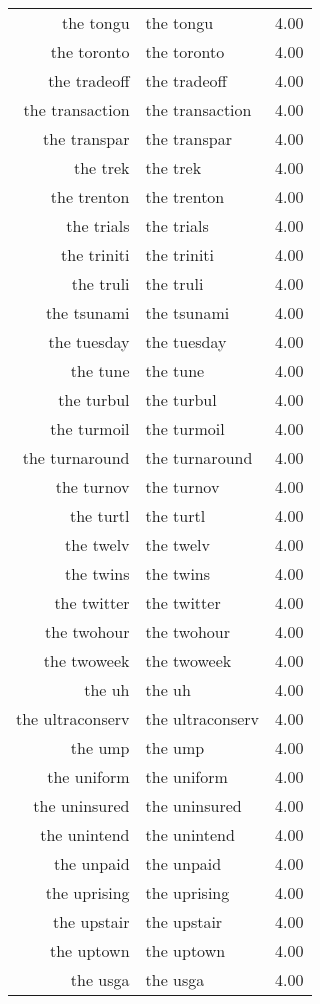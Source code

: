 \begin{table}[ht]
\begin{tabular}{rlr}
  the tongu & the tongu & 4.00 \\ 
  the toronto & the toronto & 4.00 \\ 
  the tradeoff & the tradeoff & 4.00 \\ 
  the transaction & the transaction & 4.00 \\ 
  the transpar & the transpar & 4.00 \\ 
  the trek & the trek & 4.00 \\ 
  the trenton & the trenton & 4.00 \\ 
  the trials & the trials & 4.00 \\ 
  the triniti & the triniti & 4.00 \\ 
  the truli & the truli & 4.00 \\ 
  the tsunami & the tsunami & 4.00 \\ 
  the tuesday & the tuesday & 4.00 \\ 
  the tune & the tune & 4.00 \\ 
  the turbul & the turbul & 4.00 \\ 
  the turmoil & the turmoil & 4.00 \\ 
  the turnaround & the turnaround & 4.00 \\ 
  the turnov & the turnov & 4.00 \\ 
  the turtl & the turtl & 4.00 \\ 
  the twelv & the twelv & 4.00 \\ 
  the twins & the twins & 4.00 \\ 
  the twitter & the twitter & 4.00 \\ 
  the twohour & the twohour & 4.00 \\ 
  the twoweek & the twoweek & 4.00 \\ 
  the uh & the uh & 4.00 \\ 
  the ultraconserv & the ultraconserv & 4.00 \\ 
  the ump & the ump & 4.00 \\ 
  the uniform & the uniform & 4.00 \\ 
  the uninsured & the uninsured & 4.00 \\ 
  the unintend & the unintend & 4.00 \\ 
  the unpaid & the unpaid & 4.00 \\ 
  the uprising & the uprising & 4.00 \\ 
  the upstair & the upstair & 4.00 \\ 
  the uptown & the uptown & 4.00 \\ 
  the usga & the usga & 4.00 \\ 

\end{tabular}
\end{table}
